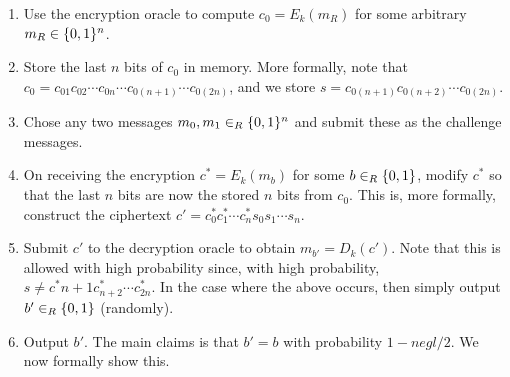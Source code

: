 \documentclass{article}
\begin{document}
\begin{enumerate}[,label=\alph*.]
\begin{enumerate}[noitemsep,topsep=\mdcompacttopsep]%

\item{}Use the encryption oracle to compute $c_0 = E_k(m_R)$ for some arbitrary $m_R \in \{0,1\}^n$.%

\item{}Store the last $n$ bits of $c_0$ in memory. More formally, note that $c_0 = c_{01}c_{02} \cdots c_{0n} \cdots c_{0(n+1)}\cdots c_{0(2n)}$,
and we store $s = c_{0(n+1)}c_{0(n+2)} \cdots c_{0(2n)}$.%

\item{}Chose any two messages $m_0, m_1 \in_R \{0,1\}^n$ and submit these as the challenge messages.%

\item{}On receiving the encryption $c^* = E_k(m_b)$ for some $b \in_R \{0,1\}$, modify $c^*$ so that the last
$n$ bits are now the stored $n$ bits from $c_0$. This is, more formally, construct the ciphertext
$c' = c^*_0c^*_1 \cdots c^*_ns_0s_1 \cdots s_n$.%

\item{}Submit $c'$ to the decryption oracle to obtain $m_{b'} = D_k(c')$. Note that this is allowed with 
high probability since, with high probability, $s \neq c^*{n+1}c^*_{n+2} \cdots c^*_{2n}$. In the
case where the above occurs, then simply output $b' \in_R \{0,1\}$ (randomly).%

\item{}
Output $b'$.%
The main claims is that $b' = b$ with probability $1 - negl/2$. We now formally show this.


\end{enumerate}
\end{enumerate}
\end{document}

